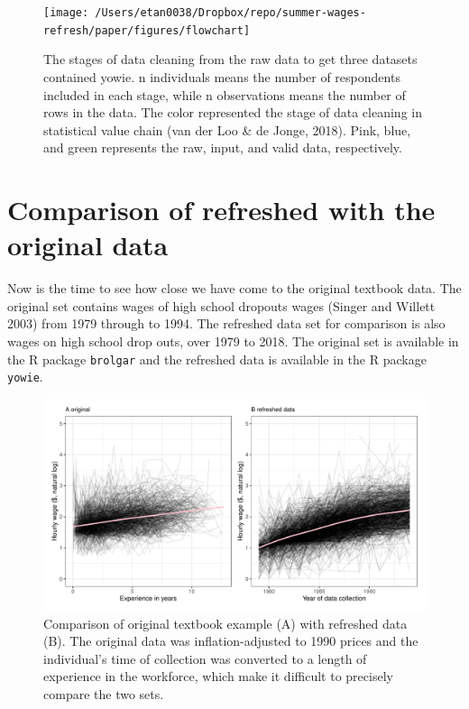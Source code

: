 \documentclass{article}
\begin{document}
\begin{figure}

{\centering \texttt{[image: /Users/etan0038/Dropbox/repo/summer-wages-refresh/paper/figures/flowchart]} 

}

\caption{The stages of data cleaning from the raw data to get three datasets contained yowie. n individuals means the number of respondents included in each stage, while n observations means the number of rows in the data. The color represented the stage of data cleaning in statistical value chain (van der Loo \& de Jonge, 2018). Pink, blue, and green represents the raw, input, and valid data, respectively.}\label{fig:flow-chart}
\end{figure}

\hypertarget{compare}{%
\section{Comparison of refreshed with the original data}\label{compare}}

Now is the time to see how close we have come to the original textbook data. The original set contains wages of high school dropouts wages (Singer and Willett 2003) from 1979 through to 1994. The refreshed data set for comparison is also wages on high school drop outs, over 1979 to 2018. The original set is available in the R package \texttt{brolgar} and the refreshed data is available in the R package \texttt{yowie}.

\begin{figure}

{\centering \includegraphics[width=1\linewidth]{figures/plotting-sw-do-1} 

}

\caption{Comparison of original textbook example (A) with refreshed data (B). The original data was inflation-adjusted to 1990 prices and the individual's time of collection was converted to a length of experience in the workforce, which make it difficult to precisely compare the two sets.}\label{fig:plotting-sw-do}
\end{figure}
\end{document}
